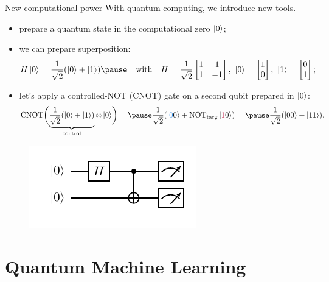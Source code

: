 \documentclass[8pt, xcolor={svgnames}, hyperref={linkcolor=amethyst}]{beamer}
\begin{document}
\begin{frame}{New computational power}
\pause
With quantum computing, we introduce new tools.
\pause
\begin{itemize}[noitemsep]
\item[\faRocket] prepare a quantum state in the computational zero $\ket{0}$;
\pause
\item[\faSliders] we can prepare superposition: 
$$H\ket{0} = \frac{1}{\sqrt{2}}(\ket{0} + \ket{1}) \pause \quad \text{with} \quad H = \frac{1}{\sqrt{2}}
\begin{bmatrix} 1 & 1 \\ 1 & -1 \end{bmatrix},\,\, \ket{0}=\begin{bmatrix} 1 \\ 0 
\end{bmatrix},\,\,\ket{1}=\begin{bmatrix} 0 \\ 1 \end{bmatrix};$$
\pause
\item[\faShareAlt] let's apply a controlled-NOT (CNOT) gate on a second qubit prepared in $\ket{0}$:
$$ \text{CNOT} \biggl( \underbrace{\frac{1}{\sqrt{2}}(\ket{0} + \ket{1})}_{\text{control}}\otimes 
\ket{0} \biggr) = \pause \frac{1}{\sqrt{2}}(\ket{\textcolor{bleudefrance}{0}0} + 
\text{NOT}_{\rm targ}\ket{\textcolor{brightmaroon}{1}0}) = \pause \frac{1}{\sqrt{2}}(\ket{00} + \ket{11}). $$
\end{itemize}
\pause
\begin{figure}
   \includegraphics[width=0.6\linewidth]{figures/baby3.pdf}
\end{figure}    
\end{frame}

\section{Quantum Machine Learning}
\end{document}
